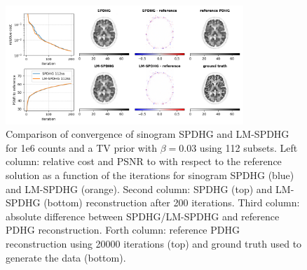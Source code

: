 \begin{figure}
  \centering
    \includegraphics[width=0.8\textwidth]{./figs/brain2d_counts_1.0E+06_seed_1_beta_3.0E-02_prior_TV_niter_ref_20000_fwhm_4.5_4.5_niter_200.png}
  \caption{Comparison of convergence of sinogram SPDHG and LM-SPDHG
           for 1e6 counts and a TV prior with $\beta = 0.03$ using 112 subsets.
           Left column: relative cost and PSNR to with respect to the reference solution as
           a function of the iterations for sinogram SPDHG (blue) and LM-SPDHG (orange).
           Second column: SPDHG (top) and LM-SPDHG (bottom) reconstruction after 200 iterations.
           Third column: absolute difference between SPDHG/LM-SPDHG and reference PDHG reconstruction.
           Forth column: reference PDHG reconstruction using 20000 iterations (top) and ground truth
           used to generate the data (bottom).
          }
  \label{fig:1e6_TV_003}
\end{figure}


